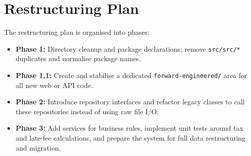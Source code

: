 \section{Restructuring Plan}

The restructuring plan is organised into phases:

\begin{itemize}[leftmargin=1.2cm]
  \item \textbf{Phase 1:} Directory cleanup and package declarations;
        remove \texttt{src/src/*} duplicates and normalise package
        names.
  \item \textbf{Phase 1.1:} Create and stabilise a dedicated
        \texttt{forward-engineered/} area for all new web or API code.
  \item \textbf{Phase 2:} Introduce repository interfaces and refactor
        legacy classes to call these repositories instead of using
        raw file I/O.
  \item \textbf{Phase 3:} Add services for business rules, implement
        unit tests around tax and late-fee calculations, and prepare the
        system for full data restructuring and migration.
\end{itemize}

